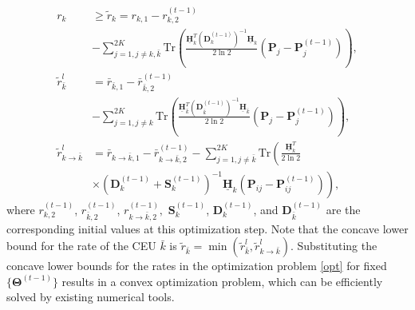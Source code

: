 \documentclass[a4, conference]{IEEEtran}
\theoremstyle{definition}
\begin{document}
\begin{align}%
\nonumber
 r_{k}&\geq \tilde{r}_{k}=r_{k,1}%
-r_{k,2}^{(t-1)}
\\
\label{l-r-lk}
&-\!\!\!\!\sum_{j=1,j\neq k,\bar{k}}^{2K}\!\!\!\!
\text{Tr}\!\left(\!
\frac{
\underline{\mathbf{H}}_{k}^T
(\mathbf{D}_{k}^{(t-1)})^{-1}
\underline{\mathbf{H}}_{k}
}
{2\ln 2}\!
\left(\mathbf{P}_{j}-\mathbf{P}_{j}^{(t-1)}\right)\!\!\!
\right)\!,
\\
\nonumber
\tilde{r}_{\bar{k}}^l&=\bar{r}_{\bar{k},1}%
-\bar{r}_{\bar{k},2}^{(t-1)}
\\&
\label{l-r-lk-bar}
-\!\!\!\!
\sum_{j=1,j\neq k}^{2K}\!\!\!
\text{Tr}\!
\left(
\frac{
\underline{\mathbf{H}}_{\bar{k}}^T
(\mathbf{D}_{\bar{k}}^{(t-1)})^{-1}
\underline{\mathbf{H}}_{\bar{k}}
}
{2\ln 2}
\left(\mathbf{P}_{j}-\mathbf{P}_{j}^{(t-1)}\right)\!\!
\right),
\\
\nonumber
\tilde{r}_{k\rightarrow\bar{k}}^l&=\bar{r}_{k\rightarrow\bar{k},1}%
-\bar{r}_{k\rightarrow\bar{k},2}^{(t-1)}
-\!\!\!\sum_{j=1,j\neq\bar{k}}^{2K}
\!\!\!
\text{Tr}\!
\left(\!\!
\frac{
\underline{\mathbf{H}}_{k}^T
}
{2\ln 2}\right.
\\
&
\left.
\times\left(
\mathbf{D}_{k}^{(t-1)}\!\!+\!\mathbf{S}_{k}^{(t-1)}
\right)^{-1}
\underline{\mathbf{H}}_{k}\left(\mathbf{P}_{ij}-\mathbf{P}_{ij}^{(t-1)}\right)
\right),
\label{l-r-lk-bar-2}
\end{align}
where $r_{k,2}^{(t-1)}$, $r_{\bar{k},2}^{(t-1)}$, $r_{k\rightarrow\bar{k},2}^{(t-1)},$ $\mathbf{S}_{k}^{(t-1)}$,  $\mathbf{D}_{k}^{(t-1)}$, and $\mathbf{D}_{\bar{k}}^{(t-1)}$ are the corresponding initial values at this optimization step. 
Note that the concave lower bound for the rate of the CEU $\bar{k}$ is 
$\tilde{r}_{\bar{k}}=\min\left(\tilde{r}_{\bar{k}}^l,\tilde{r}_{k\rightarrow\bar{k}}^l\right).$
 Substituting the concave lower bounds for the rates in the optimization problem \eqref{opt} for fixed $\{\bm{\Theta}^{(t-1)}\}$ results in a convex optimization problem, which can be efficiently solved by existing numerical tools.
\end{document}
